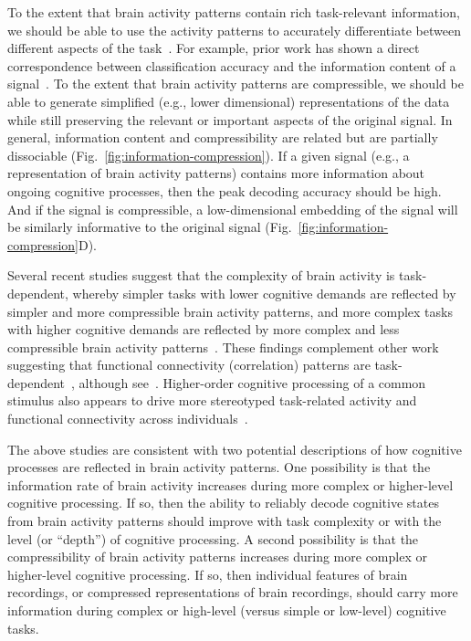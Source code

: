 \documentclass[english, 11pt]{article}
\begin{document}
To the extent that brain activity patterns contain rich task-relevant
information, we should be able to use the activity patterns to accurately
differentiate between different aspects of the task~\citep[e.g., using pattern
classifiers;][]{NormEtal06b}. For example, prior work has shown a direct
correspondence between classification accuracy and the information content of a
signal~\citep{Alva02}. To the extent that brain activity patterns are
compressible, we should be able to generate simplified (e.g., lower
dimensional) representations of the data while still preserving the relevant or
important aspects of the original signal. In general, information content and
compressibility are related but are partially dissociable
(Fig.~\ref{fig:information-compression}). If a given signal (e.g., a
representation of brain activity patterns) contains more information about
ongoing cognitive processes, then the peak decoding accuracy should be high.
And if the signal is compressible, a low-dimensional embedding of the signal
will be similarly informative to the original signal
(Fig.~\ref{fig:information-compression}D).


Several recent studies suggest that the complexity of brain activity is
task-dependent, whereby simpler tasks with lower cognitive demands are
reflected by simpler and more compressible brain activity patterns, and more
complex tasks with higher cognitive demands are reflected by more complex and
less compressible brain activity patterns~\citep{MackEtal20, OwenEtal21}. These
findings complement other work suggesting that functional connectivity
(correlation) patterns are task-dependent~\citep{FinnEtal17, OwenEtal20,
ColeEtal14}, although see~\cite{GratEtal18}. Higher-order cognitive processing
of a common stimulus also appears to drive more stereotyped task-related
activity and functional connectivity across individuals~\citep{HassEtal08,
LernEtal11, SimoChan20, SimoEtal16}.

The above studies are consistent with two potential descriptions of how
cognitive processes are reflected in brain activity patterns. One possibility
is that the information rate of brain activity increases during more complex or
higher-level cognitive processing. If so, then the ability to reliably decode
cognitive states from brain activity patterns should improve with task
complexity or with the level (or ``depth'') of cognitive processing. A second
possibility is that the compressibility of brain activity patterns increases
during more complex or higher-level cognitive processing. If so, then
individual features of brain recordings, or compressed representations of brain
recordings, should carry more information during complex or high-level (versus
simple or low-level) cognitive tasks.
\end{document}
